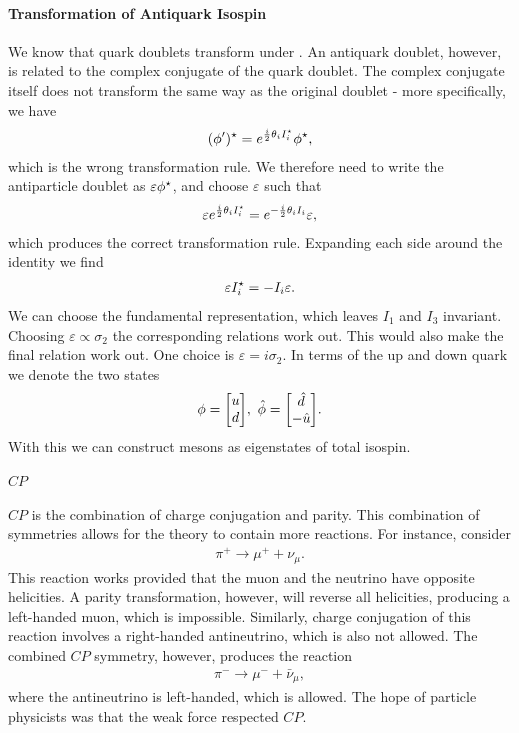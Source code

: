 \paragraph{Transformation of Antiquark Isospin}
We know that quark doublets transform under . An antiquark doublet, however, is related to the complex conjugate of the quark doublet. The complex conjugate itself does not transform the same way as the original doublet - more specifically, we have
\begin{align*}
	(\phi^{\prime})^{\star} = e^{\frac{i}{2}\theta_{i}I_{i}^{\star}}\phi^{\star},
\end{align*}
which is the wrong transformation rule. We therefore need to write the antiparticle doublet as $\varepsilon\phi^{\star}$, and choose $\varepsilon$ such that
\begin{align*}
	\varepsilon e^{\frac{i}{2}\theta_{i}I_{i}^{\star}} = e^{-\frac{i}{2}\theta_{i}I_{i}}\varepsilon,
\end{align*}
which produces the correct transformation rule. Expanding each side around the identity we find
\begin{align*}
	\varepsilon I_{i}^{\star} = -I_{i}\varepsilon.
\end{align*}
We can choose the fundamental representation, which leaves $I_{1}$ and $I_{3}$ invariant. Choosing $\varepsilon\propto\sigma_{2}$ the corresponding relations work out. This would also make the final relation work out. One choice is $\varepsilon = i\sigma_{2}$. In terms of the up and down quark we denote the two states
\begin{align*}
	\phi = \mqty[
		u \\
		d
	],\ \hat{\phi} = \mqty[
		\hat{d} \\
		-\hat{u}
	].
\end{align*}
With this we can construct mesons as eigenstates of total isospin.

\paragraph{$CP$}
$CP$ is the combination of charge conjugation and parity. This combination of symmetries allows for the theory to contain more reactions. For instance, consider
\begin{align*}
	\pi^{+} \to \mu^{+} + \nu_{\mu}.
\end{align*}
This reaction works provided that the muon and the neutrino have opposite helicities. A parity transformation, however, will reverse all helicities, producing a left-handed muon, which is impossible. Similarly, charge conjugation of this reaction involves a right-handed antineutrino, which is also not allowed. The combined $CP$ symmetry, however, produces the reaction
\begin{align*}
	\pi^{-} \to \mu^{-} + \bar{\nu}_{\mu},
\end{align*}
where the antineutrino is left-handed, which is allowed. The hope of particle physicists was that the weak force respected $CP$.


